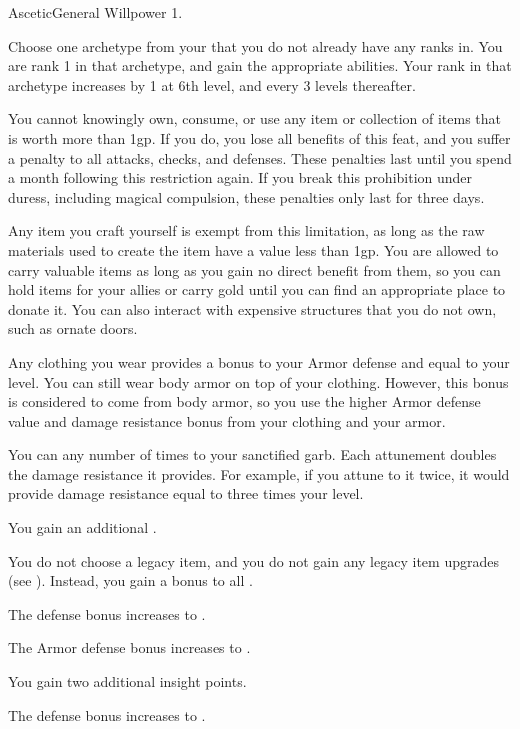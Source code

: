   \begin{feat}{Ascetic}{General}
    \featpre Willpower 1.

     Choose one archetype from your  that you do not already have any
    ranks in.
    You are rank 1 in that archetype, and gain the appropriate abilities.
    Your rank in that archetype increases by 1 at 6th level, and every 3 levels thereafter.

     You cannot knowingly own, consume, or use any item or collection of items that is worth more than 1gp.
    If you do, you lose all benefits of this feat, and you suffer a  penalty to all attacks, checks, and defenses.
    These penalties last until you spend a month following this restriction again.
    If you break this prohibition under duress, including magical compulsion, these penalties only last for three days.

    Any item you craft yourself is exempt from this limitation, as long as the raw materials used to create the item have a value less than 1gp.
    You are allowed to carry valuable items as long as you gain no direct benefit from them, so you can hold items for your allies or carry gold until you can find an appropriate place to donate it.
    You can also interact with expensive structures that you do not own, such as ornate doors.

     Any clothing you wear provides a  bonus to your Armor defense and  equal to your level.
    You can still wear body armor on top of your clothing.
    However, this bonus is considered to come from body armor, so you use the higher Armor defense value and damage resistance bonus from your clothing and your armor.

    You can  any number of times to your sanctified garb.
    Each attunement doubles the damage resistance it provides.
    For example, if you attune to it twice, it would provide damage resistance equal to three times your level.

     You gain an additional .

     You do not choose a legacy item, and you do not gain any legacy item upgrades (see ).
    Instead, you gain a  bonus to all .

     The defense bonus increases to .

     The Armor defense bonus increases to .

     You gain two additional insight points.

     The defense bonus increases to .
  \end{feat}

